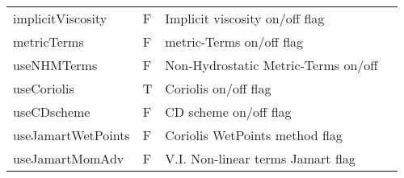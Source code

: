 \begin{table}
\begin{tabular}{lllc}
    \\
   implicitViscosity   &                     F
    &   Implicit viscosity on/off flag 
    &  %
    \\
   metricTerms   &                     F
    &   metric-Terms on/off flag 
    &  %
    \\
   useNHMTerms   &                     F
    &   Non-Hydrostatic Metric-Terms on/off 
    &  %
    \\
   useCoriolis   &                     T
    &   Coriolis on/off flag 
    &  %
    \\
   useCDscheme   &                     F
    &   CD scheme on/off flag 
    &  %
    \\
   useJamartWetPoints  &                     F
    &   Coriolis WetPoints method flag 
    &  %
    \\
   useJamartMomAdv  &                     F
    &   V.I. Non-linear terms Jamart flag 
    &  %
    \\
\end{tabular}
\end{table}

